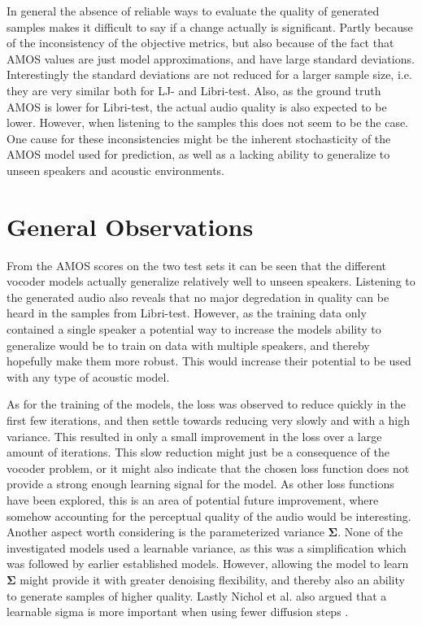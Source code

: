 \documentclass{report}
\begin{document}
In general the absence of reliable ways to evaluate the quality of generated samples makes it difficult to say if a change actually is significant. Partly because of the inconsistency of the objective metrics, but also because of the fact that AMOS values are just model approximations, and have large standard deviations. Interestingly the standard deviations are not reduced for a larger sample size, i.e. they are very similar both for LJ- and Libri-test. Also, as the ground truth AMOS is lower for Libri-test, the actual audio quality is also expected to be lower. However, when listening to the samples this does not seem to be the case. One cause for these inconsistencies might be the inherent stochasticity of the AMOS model used for prediction, as well as a lacking ability to generalize to unseen speakers and acoustic environments.

\section{General Observations} \label{sec:genobs}

From the AMOS scores on the two test sets it can be seen that the different vocoder models actually generalize relatively well to unseen speakers. Listening to the generated audio also reveals that no major degredation in quality can be heard in the samples from Libri-test. However, as the training data only contained a single speaker a potential way to increase the models ability to generalize would be to train on data with multiple speakers, and thereby hopefully make them more robust. This would increase their potential to be used with any type of acoustic model.

As for the training of the models, the loss was observed to reduce quickly in the first few iterations, and then settle towards reducing very slowly and with a high variance. This resulted in only a small improvement in the loss over a large amount of iterations. This slow reduction might just be a consequence of the vocoder problem, or it might also indicate that the chosen loss function does not provide a strong enough learning signal for the model. As other loss functions have been explored, this is an area of potential future improvement, where somehow accounting for the perceptual quality of the audio would be interesting. Another aspect worth considering is the parameterized variance $\bm{\Sigma}$. None of the investigated models used a learnable variance, as this was a simplification which was followed by earlier established models. However, allowing the model to learn $\bm{\Sigma}$ might provide it with greater denoising flexibility, and thereby also an ability to generate samples of higher quality. Lastly Nichol et al. also argued that a learnable sigma is more important when using fewer diffusion steps \cite{nichol2021improved}.
\end{document}
